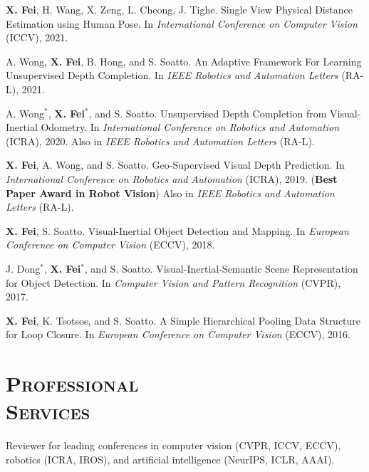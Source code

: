 \documentclass[margin, line]{res} %
\begin{document}
\begin{resume}
\begin{enumerate}[label={[\bf\arabic*]},leftmargin=*]
\item
{\bf X. Fei}, H. Wang, X. Zeng, L. Cheong, J. Tighe. Single View Physical Distance Estimation using Human Pose. In \textit{International Conference on Computer Vision} (ICCV), 2021.
\item
A. Wong, {\bf X. Fei}, B. Hong, and S. Soatto. An Adaptive Framework For Learning Unsupervised Depth Completion. In \textit{IEEE Robotics and Automation Letters} (RA-L), 2021.
\item
A. Wong$^*$, {\bf X. Fei}$^*$, and S. Soatto. Unsupervised Depth Completion from Visual-Inertial Odometry.
In \textit{International Conference on Robotics and Automation} (ICRA), 2020. Also in \textit{IEEE Robotics and Automation Letters} (RA-L).
\item 
{\bf X. Fei}, A. Wong, and S. Soatto. Geo-Supervised Visual Depth Prediction. 
In \textit{International Conference on Robotics and Automation} (ICRA), 2019. 
(\textbf{Best Paper Award in Robot Vision})
Also in \textit{IEEE Robotics and Automation Letters} (RA-L).
\item 
{\bf X. Fei}, S. Soatto. Visual-Inertial Object Detection and Mapping. 
In \textit{European Conference on Computer Vision} (ECCV), 2018.
\item 
J. Dong$^*$, {\bf X. Fei}$^*$, and S. Soatto. Visual-Inertial-Semantic Scene Representation for Object Detection. 
In \textit{Computer Vision and Pattern Recognition} (CVPR), 2017.
\item 
{\bf X. Fei}, K. Tsotsos, and S. Soatto. A Simple Hierarchical Pooling Data Structure for Loop Closure. 
In \textit{European Conference on Computer Vision} (ECCV), 2016.
\end{enumerate}

\section{\textsc{Professional\\Services}}
Reviewer for leading conferences in computer vision (CVPR, ICCV, ECCV), robotics (ICRA, IROS), and artificial intelligence (NeurIPS, ICLR, AAAI).



\end{resume}
\end{document}
